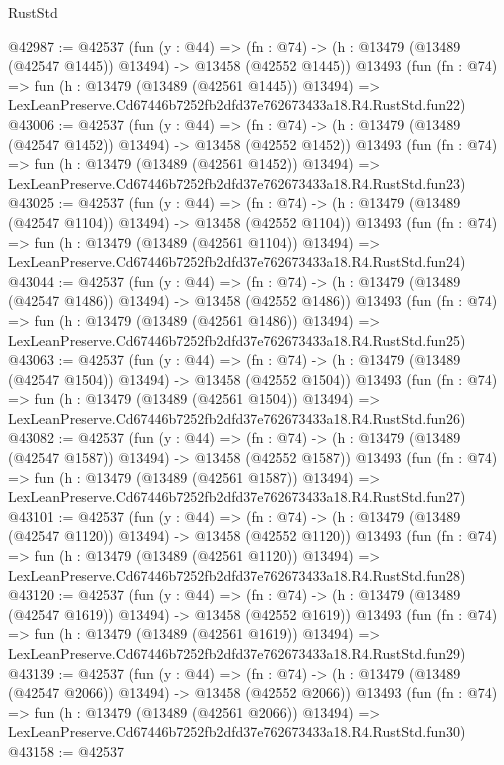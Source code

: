 \begin{lexlean}{RustStd}
\begin{coremodule}
@42987 := @42537
    (fun (y : @44) =>
    (fn : @74) -> (h : @13479 (@13489 (@42547 @1445)) @13494) -> @13458 (@42552 @1445))
    @13493
    (fun (fn : @74) =>
    fun (h : @13479 (@13489 (@42561 @1445)) @13494) =>
    LexLeanPreserve.Cd67446b7252fb2dfd37e762673433a18.R4.RustStd.fun22)
@43006 := @42537
    (fun (y : @44) =>
    (fn : @74) -> (h : @13479 (@13489 (@42547 @1452)) @13494) -> @13458 (@42552 @1452))
    @13493
    (fun (fn : @74) =>
    fun (h : @13479 (@13489 (@42561 @1452)) @13494) =>
    LexLeanPreserve.Cd67446b7252fb2dfd37e762673433a18.R4.RustStd.fun23)
@43025 := @42537
    (fun (y : @44) =>
    (fn : @74) -> (h : @13479 (@13489 (@42547 @1104)) @13494) -> @13458 (@42552 @1104))
    @13493
    (fun (fn : @74) =>
    fun (h : @13479 (@13489 (@42561 @1104)) @13494) =>
    LexLeanPreserve.Cd67446b7252fb2dfd37e762673433a18.R4.RustStd.fun24)
@43044 := @42537
    (fun (y : @44) =>
    (fn : @74) -> (h : @13479 (@13489 (@42547 @1486)) @13494) -> @13458 (@42552 @1486))
    @13493
    (fun (fn : @74) =>
    fun (h : @13479 (@13489 (@42561 @1486)) @13494) =>
    LexLeanPreserve.Cd67446b7252fb2dfd37e762673433a18.R4.RustStd.fun25)
@43063 := @42537
    (fun (y : @44) =>
    (fn : @74) -> (h : @13479 (@13489 (@42547 @1504)) @13494) -> @13458 (@42552 @1504))
    @13493
    (fun (fn : @74) =>
    fun (h : @13479 (@13489 (@42561 @1504)) @13494) =>
    LexLeanPreserve.Cd67446b7252fb2dfd37e762673433a18.R4.RustStd.fun26)
@43082 := @42537
    (fun (y : @44) =>
    (fn : @74) -> (h : @13479 (@13489 (@42547 @1587)) @13494) -> @13458 (@42552 @1587))
    @13493
    (fun (fn : @74) =>
    fun (h : @13479 (@13489 (@42561 @1587)) @13494) =>
    LexLeanPreserve.Cd67446b7252fb2dfd37e762673433a18.R4.RustStd.fun27)
@43101 := @42537
    (fun (y : @44) =>
    (fn : @74) -> (h : @13479 (@13489 (@42547 @1120)) @13494) -> @13458 (@42552 @1120))
    @13493
    (fun (fn : @74) =>
    fun (h : @13479 (@13489 (@42561 @1120)) @13494) =>
    LexLeanPreserve.Cd67446b7252fb2dfd37e762673433a18.R4.RustStd.fun28)
@43120 := @42537
    (fun (y : @44) =>
    (fn : @74) -> (h : @13479 (@13489 (@42547 @1619)) @13494) -> @13458 (@42552 @1619))
    @13493
    (fun (fn : @74) =>
    fun (h : @13479 (@13489 (@42561 @1619)) @13494) =>
    LexLeanPreserve.Cd67446b7252fb2dfd37e762673433a18.R4.RustStd.fun29)
@43139 := @42537
    (fun (y : @44) =>
    (fn : @74) -> (h : @13479 (@13489 (@42547 @2066)) @13494) -> @13458 (@42552 @2066))
    @13493
    (fun (fn : @74) =>
    fun (h : @13479 (@13489 (@42561 @2066)) @13494) =>
    LexLeanPreserve.Cd67446b7252fb2dfd37e762673433a18.R4.RustStd.fun30)
@43158 := @42537

\end{coremodule}
\end{lexlean}
